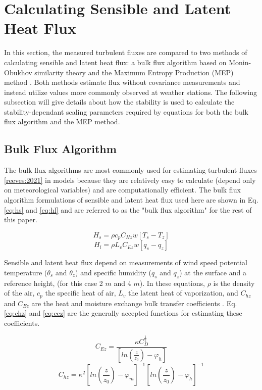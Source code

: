\section{Calculating Sensible and Latent Heat Flux}
In this section, the measured turbulent fluxes are compared to two methods of calculating sensible and latent heat flux: a bulk flux algorithm based on Monin-Obukhov similarity theory \citep{foken:2008} and the Maximum Entropy Production (MEP) method \citep{zhang:2021, wang:2014, wang:2009}. Both methods estimate flux without covariance measurements and instead utilize values more commonly observed at weather stations. The following subsection will give details about how the stability is used to calculate the stability-dependant scaling parameters required by equations for both the bulk flux algorithm and the MEP method.  

\subsection{Bulk Flux Algorithm}
The bulk flux algorithms are most commonly used for estimating turbulent fluxes \ref{reeves:2021} in models because they are relatively easy to calculate (depend only on meteorological variables) and are computationally efficient. The bulk flux algorithm formulations of sensible and latent heat flux used here are shown in Eq. \ref{eq:hs} and \ref{eq:hl} and are referred to as the "bulk flux algorithm" for the rest of this paper.

\begin{equation}\label{eq:hs}
H_{s} = \rho c_{p} C_{Hz} w [T_{s} - T_{z}]
\end{equation}
\begin{equation}\label{eq:hl}
H_{l} = \rho L_{v} C_{Ez} w [q_{s} - q_{z}] 
\end{equation}

Sensible and latent heat flux depend on measurements of wind speed potential temperature ($\theta_{s}$ and $\theta_{z}$) and specific humidity ($q_{s}$ and $q_{z}$) at the surface and a reference height, (for this case 2 $m$ and 4 $m$). In these equations, $\rho$ is the density of the air, $c_{p}$ the specific heat of air, $L_{v}$ the latent heat of vaporization, and $C_{hz}$ and $C_{Ez}$ are the heat and moisture exchange bulk transfer coefficients \citep{foken:2008, andreas:311}. Eq. \ref{eq:chz} and \ref{eq:cez} are the generally accepted functions for estimating these coefficients. 

\begin{equation}\label{eq:cez}
C_{Ez} = \frac{\kappa C_{D}^{\frac{1}{2}}}{[ln(\frac{z}{z_{0}})-\varphi_{h}]}
\end{equation}
\begin{equation}\label{eq:chz}
C_{hz} =  \kappa^{2} \left[ ln \left( \frac{z}{z_{0}} \right) - \varphi_{m} \right] ^{-1} \left[ ln \left( \frac{z}{z_{0}} \right) - \varphi_{h} \right] ^{-1}
\end{equation}

